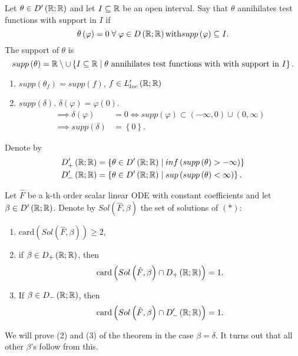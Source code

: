 \begin{definition}
	Let $\theta \in  D'\left( \mathbb{R}; \mathbb{R} \right) $ and let $I \subseteq \mathbb{R}$ be an open interval. Say that $\theta$ annihilates test functions with support in $I$ if 
	\[
		\theta\left( \varphi \right) = 0 \forall  \varphi \in  D \left(  \R; \R \right) \text{with} supp\left( \varphi  \right) \subseteq I
	.\] 
	The support of $\theta$ is
	\[
		supp\left( \theta \right) = \mathbb{R} \setminus   \cup \left\{ I \subseteq \mathbb{R}  \mid \theta \text{ annihilates test functions with with support in }I  \right\} 
	.\] 
\end{definition} 
\begin{eg}
	\begin{enumerate}
		\item $supp\left( \theta_{f} \right)  = supp\left( f \right) $, $f \in  L'_{loc}\left(  \mathbb{R}; \mathbb{R} \right) $ 
		\item $supp\left( \delta \right) $. $\delta \left( \varphi \right) = \varphi \left( 0 \right) $.
			\begin{align*}
				\implies \delta \left( \varphi \right) &= 0 \iff supp\left( \varphi \right)  \subset \left( -\infty, 0  \right)  \cup \left( 0, \infty \right) \\
				\implies supp\left( \delta \right) &= \left\{ 0 \right\} 
			.\end{align*} 
	\end{enumerate}
\end{eg}
Denote by
\begin{align*}
	D'_{+}\left( \mathbb{R}; \mathbb{R} \right) &= \left\{ \theta \in  D'\left( \mathbb{R}; \mathbb{R} \right)  \mid  inf\left( supp\left( \theta \right) > -\infty \right)  \right\} \\
	D'_{-}\left( \mathbb{R}; \mathbb{R} \right) &= \left\{ \theta \in  D'\left( \mathbb{R}; \mathbb{R} \right)  \mid  sup\left( supp\left( \theta \right) < \infty \right)  \right\}
.\end{align*}

\begin{theorem}
	Let $\hat{F}$ be a k-th order scalar linear ODE with constant coefficients and let $\beta \in  D'\left( \mathbb{R}; \mathbb{R} \right) $. Denote by $Sol\left( \hat{F}, \beta \right) $ the set of solutions of $\left( * \right) $:
	\begin{enumerate}
		\item $\text{card}\left( Sol\left( \hat{F}, \beta \right)  \right) \ge 2$, 
		\item if $\beta \in D_{+}\left( \mathbb{R}; \mathbb{R} \right) $, then 
			\[
				\text{card}\left( Sol\left( \hat{F}, \beta \right) \cap D_{+}\left( \mathbb{R}; \mathbb{R} \right)  \right)  = 1
			.\] 
		\item If $\beta \in  D_{-}\left( \mathbb{R}; \mathbb{R} \right) $, then
			\[
				\text{card}\left( Sol\left( \hat{F}, \beta \right) \cap D'_{-}\left( \mathbb{R}; \mathbb{R} \right)  \right) = 1
			.\] 
	\end{enumerate}
	We will prove (2) and (3) of the theorem in the case $\beta = \delta$. It turns out that all other $\beta$'s follow from this.
\end{theorem}
